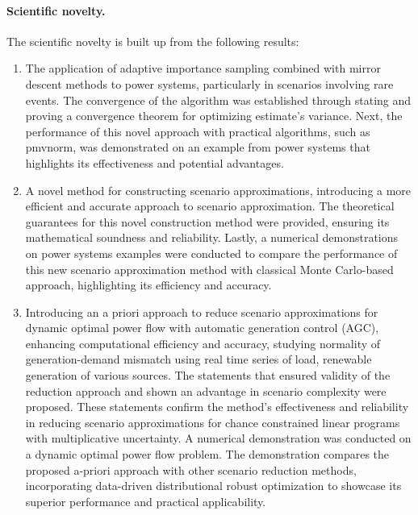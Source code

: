 
\paragraph{Scientific novelty.}


The scientific novelty is built up from the following results:
\begin{enumerate}
    \item The application of adaptive importance sampling combined with mirror descent methods to power systems, particularly in scenarios involving rare events. The convergence of the algorithm was established through stating and proving a convergence theorem for optimizing estimate's variance. Next, the performance of this novel approach with practical algorithms, such as pmvnorm, was demonstrated on an example from power systems that highlights its effectiveness and potential advantages.
    \item A novel method for constructing scenario approximations, introducing a more efficient and accurate approach to scenario approximation. The theoretical guarantees for this novel construction method were provided, ensuring its mathematical soundness and reliability. Lastly, a numerical demonstrations on power systems examples were conducted to compare the performance of this new scenario approximation method with classical Monte Carlo-based approach, highlighting its efficiency and accuracy.
    \item Introducing an a priori approach to reduce scenario approximations for dynamic optimal power flow with automatic generation control (AGC), enhancing computational efficiency and accuracy, studying normality of generation-demand mismatch using real time series of load, renewable generation of various sources. The statements that ensured validity of the reduction approach and shown an advantage in scenario complexity were proposed. These statements confirm the method's effectiveness and reliability in reducing scenario approximations for chance constrained linear programs with multiplicative uncertainty. A numerical demonstration was conducted on a dynamic optimal power flow problem. The demonstration compares the proposed a-priori approach with other scenario reduction methods, incorporating data-driven distributional robust optimization to showcase its superior performance and practical applicability.
\end{enumerate}

